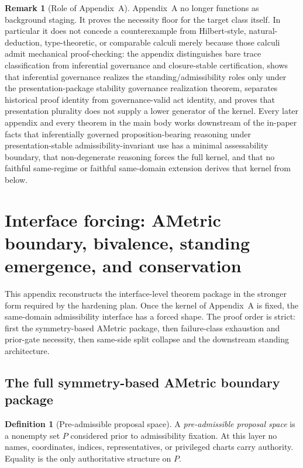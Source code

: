 \documentclass[11pt]{article}
\theoremstyle{plain}
\theoremstyle{definition}
\newtheorem{definition}[theorem]{Definition}
\newtheorem{remark}[theorem]{Remark}
\begin{document}
\begin{remark}[Role of Appendix~A]
Appendix~A no longer functions as background staging. It proves the necessity floor for the target class itself. In particular it does not concede a counterexample from Hilbert-style, natural-deduction, type-theoretic, or comparable calculi merely because those calculi admit mechanical proof-checking: the appendix distinguishes bare trace classification from inferential governance and closure-stable certification, shows that inferential governance realizes the standing/admissibility roles only under the presentation-package stability governance realization theorem, separates historical proof identity from governance-valid act identity, and proves that presentation plurality does not supply a lower generator of the kernel. Every later appendix and every theorem in the main body works downstream of the in-paper facts that inferentially governed proposition-bearing reasoning under presentation-stable admissibility-invariant use has a minimal assessability boundary, that non-degenerate reasoning forces the full kernel, and that no faithful same-regime or faithful same-domain extension derives that kernel from below.
\end{remark}

\section{Interface forcing: AMetric boundary, bivalence, standing emergence, and conservation}
\label{app:interface}

This appendix reconstructs the interface-level theorem package in the stronger form required by the hardening plan. Once the kernel of Appendix~A is fixed, the same-domain admissibility interface has a forced shape. The proof order is strict: first the symmetry-based AMetric package, then failure-class exhaustion and prior-gate necessity, then same-side split collapse and the downstream standing architecture.

\subsection{The full symmetry-based AMetric boundary package}

\begin{definition}[Pre-admissible proposal space]
A \emph{pre-admissible proposal space} is a nonempty set $P$ considered prior to admissibility fixation. At this layer no names, coordinates, indices, representatives, or privileged charts carry authority. Equality is the only authoritative structure on $P$.
\end{definition}
\end{document}
